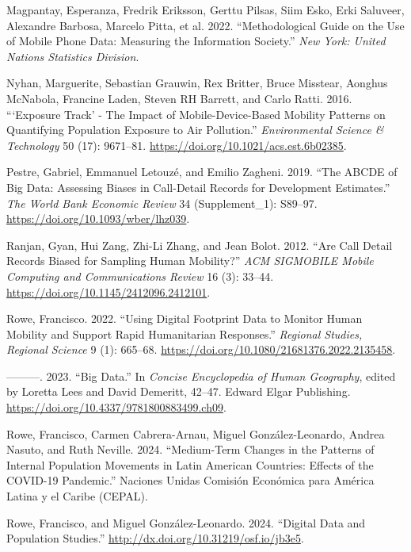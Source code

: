 \documentclass[
  sn-nature,
  11pt,
]{sn-jnl}
\newlength{\cslhangindent}
\newenvironment{CSLReferences}[2] %
 {\begin{list}{}{%
  \setlength{\itemindent}{0pt}
  \setlength{\leftmargin}{0pt}
  \setlength{\parsep}{0pt}
  \ifodd #1
   \setlength{\leftmargin}{\cslhangindent}
   \setlength{\itemindent}{-1\cslhangindent}
  \fi
  \setlength{\itemsep}{#2\baselineskip}}}
 {\end{list}}
\begin{document}
\begin{CSLReferences}{1}{0}
Magpantay, Esperanza, Fredrik Eriksson, Gerttu Pilsas, Siim Esko, Erki
Saluveer, Alexandre Barbosa, Marcelo Pitta, et al. 2022.
{``Methodological Guide on the Use of Mobile Phone Data: Measuring the
Information Society.''} \emph{New York: United Nations Statistics
Division}.

Nyhan, Marguerite, Sebastian Grauwin, Rex Britter, Bruce Misstear,
Aonghus McNabola, Francine Laden, Steven RH Barrett, and Carlo Ratti.
2016. {``{{`Exposure Track'} - The} Impact of Mobile-Device-Based
Mobility Patterns on Quantifying Population Exposure to Air
Pollution.''} \emph{Environmental Science \& Technology} 50 (17):
9671--81. \url{https://doi.org/10.1021/acs.est.6b02385}.

Pestre, Gabriel, Emmanuel Letouzé, and Emilio Zagheni. 2019. {``The
ABCDE of Big Data: Assessing Biases in Call-Detail Records for
Development Estimates.''} \emph{The World Bank Economic Review} 34
(Supplement{\_}1): S89--97. \url{https://doi.org/10.1093/wber/lhz039}.

Ranjan, Gyan, Hui Zang, Zhi-Li Zhang, and Jean Bolot. 2012. {``Are Call
Detail Records Biased for Sampling Human Mobility?''} \emph{ACM
SIGMOBILE Mobile Computing and Communications Review} 16 (3): 33--44.
\url{https://doi.org/10.1145/2412096.2412101}.

Rowe, Francisco. 2022. {``Using Digital Footprint Data to Monitor Human
Mobility and Support Rapid Humanitarian Responses.''} \emph{Regional
Studies, Regional Science} 9 (1): 665--68.
\url{https://doi.org/10.1080/21681376.2022.2135458}.

---------. 2023. {``Big Data.''} In \emph{{Concise Encyclopedia of Human
Geography}}, edited by Loretta Lees and David Demeritt, 42--47. Edward
Elgar Publishing. \url{https://doi.org/10.4337/9781800883499.ch09}.

Rowe, Francisco, Carmen Cabrera-Arnau, Miguel González-Leonardo, Andrea
Nasuto, and Ruth Neville. 2024. {``Medium-Term Changes in the Patterns
of Internal Population Movements in Latin American Countries: Effects of
the COVID-19 Pandemic.''} Naciones Unidas Comisi{ó}n Econ{ó}mica para
Am{é}rica Latina y el Caribe (CEPAL).

Rowe, Francisco, and Miguel González-Leonardo. 2024. {``Digital Data and
Population Studies.''} \url{http://dx.doi.org/10.31219/osf.io/jb3e5}.


\end{CSLReferences}
\end{document}
